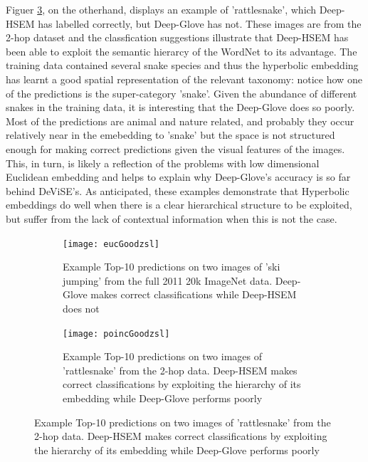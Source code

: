 \documentclass[12pt]{report}
\begin{document}
Figuer \ref{fig:poincgoodzsl}, on the otherhand, displays an example of 'rattlesnake', which Deep-HSEM has labelled correctly, but Deep-Glove has not. These images are from the 2-hop dataset and the classfication suggestions illustrate that Deep-HSEM has been able to exploit the semantic hierarcy of the WordNet to its advantage. The training data contained several snake species and thus the hyperbolic embedding has learnt a good spatial representation of the relevant taxonomy: notice how one of the predictions is the super-category 'snake'. Given the abundance of different snakes in the training data, it is interesting that the Deep-Glove does so poorly. Most of the predictions are animal and nature related, and probably they occur relatively near in the emebedding to 'snake' but the space is not structured enough for making correct predictions given the visual features of the images. This, in turn, is likely a reflection of the problems with low dimensional Euclidean embedding and helps to explain why Deep-Glove's accuracy is so far behind DeViSE's. As anticipated, these examples demonstrate that Hyperbolic embeddings do well when there is a clear hierarchical structure to be exploited, but suffer from the lack of contextual information when this is not the case.

\begin{figure}
  \centering
  \begin{subfigure}[b]{0.9\textwidth}
  \texttt{[image: eucGoodzsl]}
  \caption{Example Top-10 predictions on two images of 'ski jumping' from the full 2011 20k ImageNet data. Deep-Glove makes correct classifications while Deep-HSEM does not}
  \label{fig:eucgoodzsl}
\end{subfigure}

\begin{subfigure}[b]{0.9\textwidth}
  \texttt{[image: poincGoodzsl]}
  \caption{Example Top-10 predictions on two images of 'rattlesnake' from the 2-hop data. Deep-HSEM makes correct classifications by exploiting the hierarchy of its embedding while Deep-Glove performs poorly}
  \label{fig:poincgoodzsl}
\end{subfigure}
\end{figure}
\end{document}
